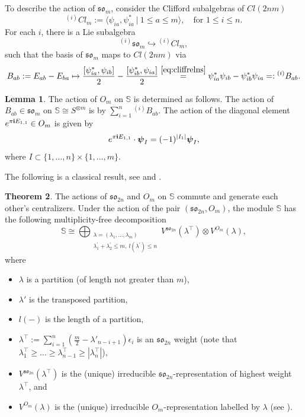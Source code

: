 \documentclass[10pt]{amsart}
\numberwithin{equation}{section}
\theoremstyle{definition}
\newtheorem{theorem}{Theorem}[section]
\newtheorem{lemma}[theorem]{Lemma}
\newcommand{\son}[1][2n]{\mathfrak{so}_{#1}}
\newcommand{\som}[1][m]{\mathfrak{so}_{#1}}
\newcommand{\ot}{\otimes}
\newcommand{\hwp}{\boldsymbol{\psi}}
\newcommand{\howespin}{\boldsymbol{\mathbb{S}}}
\begin{document}
To describe the action of $\som$, consider the Clifford subalgebras of $Cl(2nm)$
\[
{}^{(i)}Cl_m:=\langle \psi_{ia}, \psi_{ia}^* \ | \ 1\le a \le m \rangle, \quad \text{for $1\le i\le n$}.
\]
For each $i$, there is a Lie subalgebra
\[
{}^{(i)}\mathfrak{so}_m \hookrightarrow {}^{(i)}Cl_m,
\]
such that the basis of $\som$ maps to $Cl(2nm)$ via 
\begin{equation}\label{eq:Babactionsom}
B_{ab}:=E_{ab}-E_{ba}\mapsto \frac{[\psi_{ia}^*,\psi_{ib}]}{2}-\frac{[\psi_{ib}^*,\psi_{ia}]}{2}  \stackrel{\eqref{eq:cliffrelns}}{=} \psi_{ia}^*\psi_{ib}-\psi_{ib}^*\psi_{ia}=:{}^{(i)}B_{ab}.
\end{equation}

\begin{lemma}\label{lemOmaction}
The action of $O_m$ on $\howespin$ is determined as follows. The action of $B_{ab}\in \mathfrak{so}_m$ on $\howespin\cong S^{\otimes m}$ is by $\sum_{i=1}^n{}^{(i)}B_{ab}$. The action of the diagonal element $e^{\pi{\bf i}E_{1,1}}\in O_m$ is given by
\[
e^{\pi{\bf i}E_{1,1}} \cdot \hwp_{I}=(-1)^{|I_1|}\hwp_I,
\]
where $I\subset \{1, \dots, n\}\times \{1, \dots, m\}$.
\end{lemma}

The following is a classical result, see \cite[Section 4.3.5]{How95} and \cite[Proposition 5.36]{CW12}.

\begin{theorem}\label{Orthogonal_Howe_duality}
The actions of $\son$ and $O_m$ on $\howespin$ commute and generate each other's centralizers. Under the action of the pair $(\son,O_m)$, the module $\howespin$ has the following multiplicity-free decomposition
\begin{equation}\label{eq:classicalmultfreedecomposition}
    \howespin\cong \bigoplus_{\substack{\lambda=(\lambda_1,\dots, \lambda_m) \\ \lambda^{\prime}_1+\lambda^{\prime}_2\le m, \ l(\lambda^{\prime})\le n}} V^{\son}(\lambda^{\top})\ot V^{O_m}(\lambda),
\end{equation}
where 
\begin{itemize}
    \item $\lambda$ is a partition (of length not greater than $m$),
    \item $\lambda'$ is the transposed partition,
    \item $l(-)$ is the length of a partition,
    \item $\lambda^\top :=\sum_{i=1}^{n}(\frac{m}{2}-\lambda'_{n-i+1})\epsilon_i$ is an $\son$ weight (note that $\lambda^{\top}_1\ge \dots \ge \lambda_{n-1}^{\top}\ge |\lambda_n^{\top}|$),
    \item $V^{\son}(\lambda^{\top})$ is the (unique) irreducible $\son$-representation of highest weight $\lambda^\top$, and
    \item $V^{O_m}(\lambda)$ is the (unique) irreducible $O_m$-representation labelled by $\lambda$ (see \cite[Section 19.5]{FultonHarris}).
\end{itemize}
\end{theorem}
\end{document}
